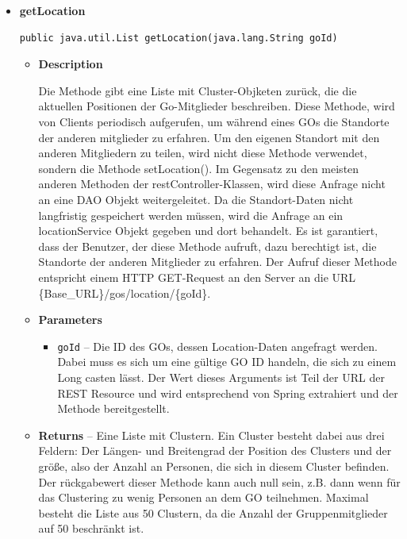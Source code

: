 \documentclass[11pt,a4paper]{report}
\begin{document}
{{{{{{{{{{{{{{{{{{{{\begin{itemize}
{\begin{itemize}
{\begin{itemize}
  \end{itemize}
}%
\end{itemize}
}%
\item{ 
\hypertarget{edu.kit.pse17.go_app.ClientCommunication.Upstream.GoRestController.getLocation(java.lang.String)}{{\bf  getLocation}\\}
\begin{lstlisting}[frame=none]
public java.util.List getLocation(java.lang.String goId)\end{lstlisting} %
\begin{itemize}
\item{
{\bf  Description}

Die Methode gibt eine Liste mit Cluster-Objketen zurück, die die aktuellen Positionen der Go-Mitglieder beschreiben. Diese Methode, wird von Clients periodisch aufgerufen, um während eines GOs die Standorte der anderen mitglieder zu erfahren. Um den eigenen Standort mit den anderen Mitgliedern zu teilen, wird nicht diese Methode verwendet, sondern die Methode setLocation(). Im Gegensatz zu den meisten anderen Methoden der restController-Klassen, wird diese Anfrage nicht an eine DAO Objekt weitergeleitet. Da die Standort-Daten nicht langfristig gespeichert werden müssen, wird die Anfrage an ein locationService Objekt gegeben und dort behandelt. Es ist garantiert, dass der Benutzer, der diese Methode aufruft, dazu berechtigt ist, die Standorte der anderen Mitglieder zu erfahren. Der Aufruf dieser Methode entspricht einem HTTP GET-Request an den Server an die URL \{Base\_URL\}/gos/location/\{goId\}.
}
\item{
{\bf  Parameters}
  \begin{itemize}
   \item{
\texttt{goId} -- Die ID des GOs, dessen Location-Daten angefragt werden. Dabei muss es sich um eine gültige GO ID handeln, die sich zu einem Long casten lässt. Der Wert dieses Arguments ist Teil der URL der REST Resource und wird entsprechend von Spring extrahiert und der Methode bereitgestellt.}
  \end{itemize}
}%
\item{{\bf  Returns} -- 
Eine Liste mit Clustern. Ein Cluster besteht dabei aus drei Feldern: Der Längen- und Breitengrad der Position des Clusters und der größe, also der Anzahl an Personen, die sich in diesem Cluster befinden. Der rückgabewert dieser Methode kann auch null sein, z.B. dann wenn für das Clustering zu wenig Personen an dem GO teilnehmen. Maximal besteht die Liste aus 50 Clustern, da die Anzahl der Gruppenmitglieder auf 50 beschränkt ist. 
}
\end{itemize}}
\end{itemize}}}}}}}}}}}}}}}}}}}}}
\end{document}
